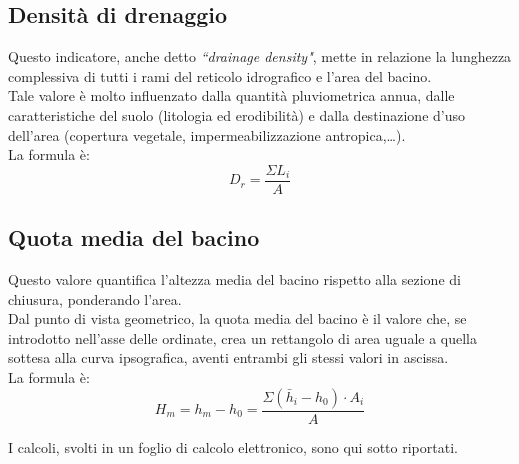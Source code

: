 \subsection{Densità di drenaggio}
Questo indicatore, anche detto \textit{``drainage density"}, mette in relazione la lunghezza complessiva di tutti i rami del reticolo idrografico e l'area del bacino.\\
Tale valore è molto influenzato dalla quantità pluviometrica annua, dalle caratteristiche del suolo (litologia ed erodibilità) e dalla destinazione d'uso dell'area (copertura vegetale, impermeabilizzazione antropica,\dots).\\
La formula è:
\begin{equation}
    D_r = \frac{\Sigma L_i}{A}
    \label{drenaggio}
\end{equation}

\subsection{Quota media del bacino}
Questo valore quantifica l'altezza media del bacino rispetto alla sezione di chiusura, ponderando l'area.\\
Dal punto di vista geometrico, la quota media del bacino è il valore che, se introdotto nell'asse delle ordinate, crea un rettangolo di area uguale a quella sottesa alla curva ipsografica, aventi entrambi gli stessi valori in ascissa.\\
La formula è:
\begin{equation}
    H_m = h_m - h_0 = \frac{\Sigma (\bar{h}_i - h_0) \cdot A_i}{A}
    \label{quota_media}
\end{equation}

I calcoli, svolti in un foglio di calcolo elettronico, sono qui sotto riportati.

